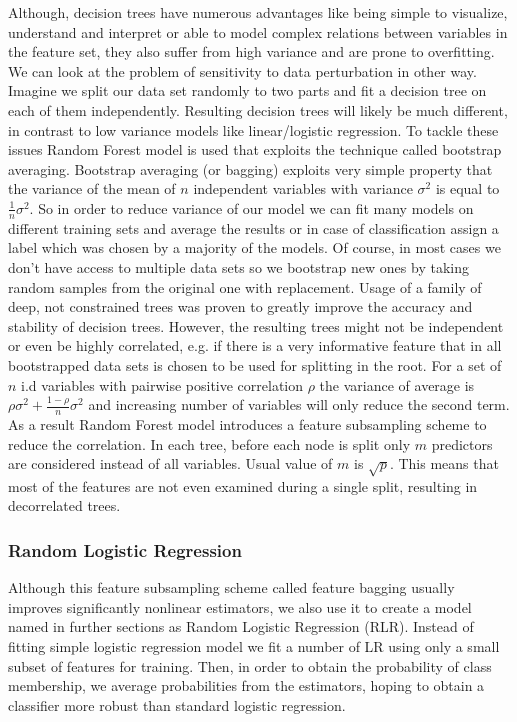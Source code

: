 \documentclass[shortabstract, english, mgr]{iithesis}
\begin{document}
Although, decision trees have numerous advantages like being simple to visualize, understand and interpret or able to model complex relations between variables in the feature set, they also suffer from high variance and are prone to overfitting. We can look at the problem of sensitivity to data perturbation in other way. Imagine we split our data set randomly to two parts and fit a decision tree on each of them independently. Resulting decision trees will likely be much different, in contrast to low variance models like linear/logistic regression. To tackle these issues Random Forest model is used that exploits the technique called bootstrap averaging. Bootstrap averaging (or bagging) exploits very simple property that the variance of the mean of $n$ independent variables with variance $\sigma^2$ is equal to $\frac{1}{n}\sigma^2$. So in order to reduce variance of our model we can fit many models on different training sets and average the results or in case of classification assign a label which was chosen by a majority of the models. Of course, in most cases we don't have access to multiple data sets so we bootstrap new ones by taking random samples from the original one with replacement. Usage of a family of deep, not constrained trees was proven to greatly improve the accuracy and stability of decision trees. However, the resulting trees might not be independent or even be highly correlated, e.g. if there is a very informative feature that in all bootstrapped data sets is chosen to be used for splitting in the root. For a set of $n$ i.d variables with pairwise positive correlation $\rho$ the variance of average is $\rho \sigma^2 + \frac{1-\rho}{n}\sigma^2$ and increasing number of variables will only reduce the second term. As a result Random Forest model introduces a feature subsampling scheme to reduce the correlation. In each tree, before each node is split only $m$ predictors are considered instead of all variables. Usual value of $m$ is  $\sqrt{p}$. This means that most of the features are not even examined during a single split, resulting in decorrelated trees. 

\subsubsection{Random Logistic Regression}

Although this feature subsampling scheme called feature bagging usually improves significantly nonlinear estimators, we also use it to create a model named in further sections as Random Logistic Regression (RLR). Instead of fitting simple logistic regression model we fit a number of LR using only a small subset of features for training. Then, in order to obtain the probability of class membership, we average probabilities from the estimators, hoping to obtain a classifier more robust than standard logistic regression.
\end{document}
